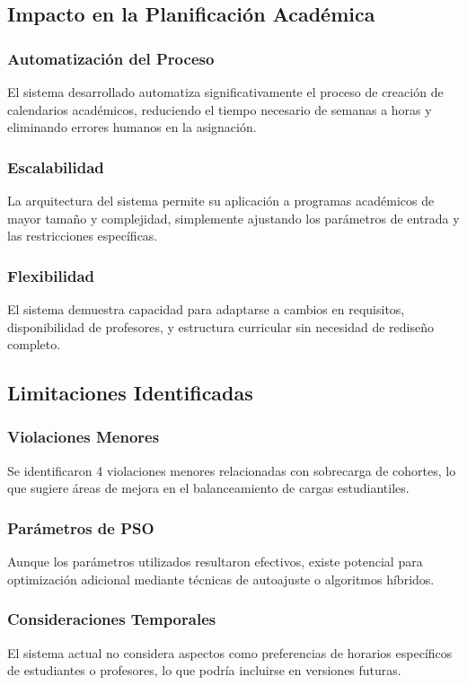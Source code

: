 \subsection{Impacto en la Planificación Académica}

\subsubsection{Automatización del Proceso}
El sistema desarrollado automatiza significativamente el proceso de creación de calendarios académicos, reduciendo el tiempo necesario de semanas a horas y eliminando errores humanos en la asignación.

\subsubsection{Escalabilidad}
La arquitectura del sistema permite su aplicación a programas académicos de mayor tamaño y complejidad, simplemente ajustando los parámetros de entrada y las restricciones específicas.

\subsubsection{Flexibilidad}
El sistema demuestra capacidad para adaptarse a cambios en requisitos, disponibilidad de profesores, y estructura curricular sin necesidad de rediseño completo.

\subsection{Limitaciones Identificadas}

\subsubsection{Violaciones Menores}
Se identificaron 4 violaciones menores relacionadas con sobrecarga de cohortes, lo que sugiere áreas de mejora en el balanceamiento de cargas estudiantiles.

\subsubsection{Parámetros de PSO}
Aunque los parámetros utilizados resultaron efectivos, existe potencial para optimización adicional mediante técnicas de autoajuste o algoritmos híbridos.

\subsubsection{Consideraciones Temporales}
El sistema actual no considera aspectos como preferencias de horarios específicos de estudiantes o profesores, lo que podría incluirse en versiones futuras.

